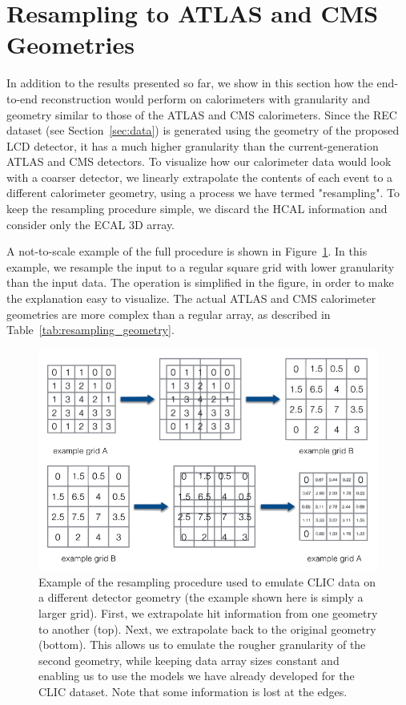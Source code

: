 \section{Resampling to ATLAS and CMS Geometries}\label{sec:resampling}

In addition to the results presented so far, we show in this section how the end-to-end reconstruction would perform on calorimeters with granularity and geometry similar to those of the ATLAS and CMS calorimeters. Since the REC dataset (see Section~\ref{sec:data}) is generated using the geometry of the proposed LCD detector, it has a much higher granularity than the current-generation ATLAS and CMS detectors. To visualize how our calorimeter data would look with a coarser detector, we linearly extrapolate the contents of each event to a different calorimeter geometry, using a process we have termed "resampling". To keep the resampling procedure simple, we discard the HCAL information and consider only the ECAL 3D array.

A not-to-scale example of the full procedure is shown in Figure~\ref{fig:resampling}. In this example, we resample the input to a regular square grid with lower granularity than the input data. The operation is simplified in the figure, in order to make the explanation easy to visualize. The actual ATLAS and CMS calorimeter geometries are more complex than a regular array, as described in Table~\ref{tab:resampling_geometry}.

\begin{figure}[htbp]
    \centering
    \includegraphics[width=\textwidth]{Images/Calo/resampling.png}
    \caption{Example of the resampling procedure used to emulate CLIC data on a different detector geometry (the example shown here is simply a larger grid). First, we extrapolate hit information from one geometry to another (top). Next, we extrapolate back to the original geometry (bottom). This allows us to emulate the rougher granularity of the second geometry, while keeping data array sizes constant and enabling us to use the models we have already developed for the CLIC dataset. Note that some information is lost at the edges.}
    \label{fig:resampling}
\end{figure}


